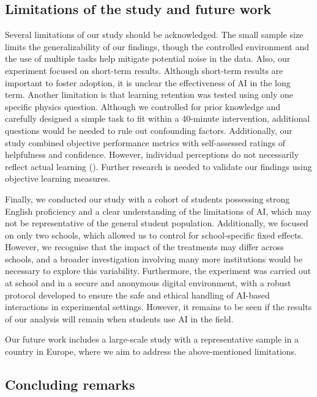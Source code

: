 \documentclass[
  11pt,
]{article}
\begin{document}
\subsection{Limitations of the study and future work}\label{limitations-of-the-study-and-future-work}

Several limitations of our study should be acknowledged. The small sample size limits the generalizability of our findings, though the controlled environment and the use of multiple tasks help mitigate potential noise in the data. Also, our experiment focused on short-term results. Although short-term results are important to foster adoption, it is unclear the effectiveness of AI in the long term. Another limitation is that learning retention was tested using only one specific physics question. Although we controlled for prior knowledge and carefully designed a simple task to fit within a 40-minute intervention, additional questions would be needed to rule out confounding factors. Additionally, our study combined objective performance metrics with self-assessed ratings of helpfulness and confidence. However, individual perceptions do not necessarily reflect actual learning (). Further research is needed to validate our findings using objective learning measures.

Finally, we conducted our study with a cohort of students possessing strong English proficiency and a clear understanding of the limitations of AI, which may not be representative of the general student population. Additionally, we focused on only two schools, which allowed us to control for school-specific fixed effects. However, we recognise that the impact of the treatments may differ across schools, and a broader investigation involving many more institutions would be necessary to explore this variability. Furthermore, the experiment was carried out at school and in a secure and anonymous digital environment, with a robust protocol developed to ensure the safe and ethical handling of AI-based interactions in experimental settings. However, it remains to be seen if the results of our analysis will remain when students use AI in the field.

Our future work includes a large-scale study with a representative sample in a country in Europe, where we aim to address the above-mentioned limitations.

\subsection{Concluding remarks}\label{concluding-remarks}
\end{document}
